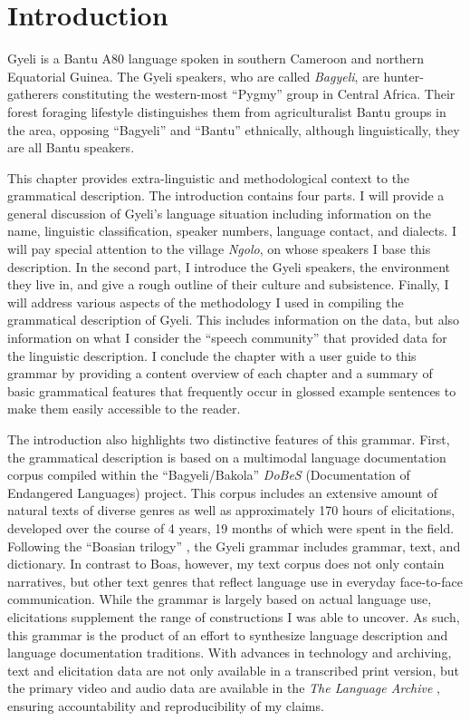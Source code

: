 \chapter{Introduction}
\label{sec:Introduction}
\setcounter{page}{1}

Gyeli is a Bantu A80 language spoken in southern Cameroon and northern Equatorial Guinea.  
The Gyeli speakers, who are called \textit{Bagyeli}, are hunter-gatherers constituting the western-most ``Pygmy'' group in Central Africa. Their forest foraging lifestyle  distinguishes them from agriculturalist Bantu groups in the area, opposing ``Bagyeli'' and ``Bantu'' ethnically, although linguistically, they are all Bantu speakers.

This chapter provides extra-linguistic and methodological context to the grammatical description. The introduction contains four parts. I will provide a general discussion of Gyeli's language situation including information on the name, linguistic classification, speaker numbers, language contact, and dialects. I will pay special attention to the village \textit{Ngolo}, on whose speakers I base this description.  In the second part, I introduce the Gyeli speakers, the environment they live in, and give a rough outline of their culture and subsistence. Finally, I will address various aspects of the methodology I used in compiling the grammatical description of Gyeli. This includes information on the data, but also information on what I consider the ``speech community'' that provided data for the linguistic description. I conclude the chapter with a user guide to this grammar by providing a content overview of each chapter and a summary of basic grammatical features that frequently occur in glossed example sentences to make them easily accessible to the reader. 

The introduction also highlights two distinctive features of this grammar.  First, the grammatical description is based on a multimodal language documentation corpus compiled within the ``Bagyeli/Bakola'' {\itshape DoBeS} (Documentation of Endangered Languages) project.  This corpus includes an extensive amount of natural texts of diverse genres as well as approximately 170 hours of elicitations, developed over the course of 4 years, 19 months of which were spent in the field. Following the ``Boasian trilogy'' \citep{evans2006}, the Gyeli grammar includes grammar, text, and dictionary. In contrast to Boas, however, my text corpus does not only contain narratives, but other text genres that reflect language use in everyday face-to-face communication.  While the grammar is largely based on actual language use, elicitations supplement the range of constructions I was able to uncover. As such, this grammar is the product of an effort to synthesize language description and language documentation traditions. With advances in technology and archiving, text and elicitation data are not only available in a transcribed print version, but the primary video and audio data are available in the {\itshape The Language Archive} \citep{grimm2020}, ensuring accountability and reproducibility of my claims.

